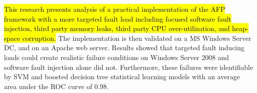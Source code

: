 \hl{This research presents analysis of a practical implementation of the
\ac{AFP} framework with a more targeted fault load including focused software
fault injection, third party memory leaks, third party \ac{CPU}
over-utilization, and heap-space corruption.} The implementation is then
validated on a \ac{MS} Windows Server \ac{DC}, and on an Apache web server.
Results showed that targeted fault inducing loads could create realistic
failure conditions on Windows Server 2008 and software fault injection alone
did not.  Furthermore, these failures were identifiable by \ac{SVM} and boosted
decision tree statistical learning models with an average area under the
\ac{ROC} curve of $0.98$.
